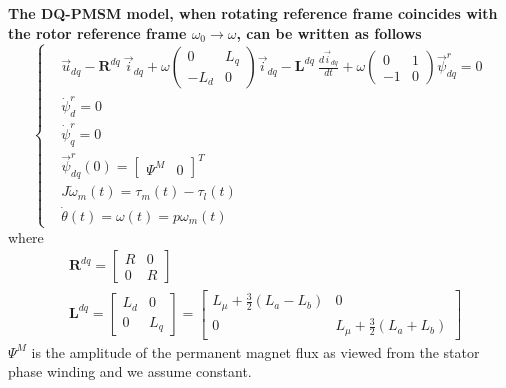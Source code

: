 \documentclass[11pt,a4paper,oneside]{book}
\numberwithin{equation}{section}
\theoremstyle{it}
\theoremstyle{definition}
\begin{document}
\begin{mybox}
	\textbf{The DQ-PMSM model, when rotating reference frame coincides with 
		the rotor reference frame $\omega_0 \rightarrow \omega$, can be written 
		as follows}
	\begin{equation}\label{twophase_eq2}
		\left\lbrace \begin{aligned}
			& \vec{u}_{dq}-\mathbf{R}^{dq}\ \vec{i}_{dq} + 
			\omega\begin{pmatrix} 0 & L_q\\ -L_d & 0 
			\end{pmatrix}\vec{i}_{dq} - \mathbf{L}^{dq}\ 
			\frac{d\vec{i}_{dq}}{dt} + \omega\begin{pmatrix} 0 & 1\\-1 & 0 
			\end{pmatrix}\vec{\psi}_{dq}^r = 0\\[6pt]
			&\dot{\psi}_d^r = 0 \\[6pt]
			&\dot{\psi}_q^r = 0 \\[6pt]
			& \vec{\psi}^r_{dq}(0) = \begin{bmatrix} \Psi^M &  0 
			\end{bmatrix}^T \\[6pt]
			& J\dot{\omega}_m(t) = \tau_m(t)-\tau_l(t) \\[6pt]
			& \dot{\theta}(t) = \omega(t) = p\omega_m(t) 
		\end{aligned} \right. 
	\end{equation}
	where
	\begin{equation*}
		\begin{aligned}
			& \mathbf{R}^{dq} = 
			\begin{bmatrix} R &  0 \\
				0 & R
			\end{bmatrix} \\[6pt]
			& \mathbf{L}^{dq} = 
			\begin{bmatrix} L_d &  0 \\
				0 & L_q
			\end{bmatrix} =
			\begin{bmatrix} L_\mu+\frac{3}{2}(L_a-L_b) &  0 \\
				0 & L_\mu+\frac{3}{2}(L_a+L_b)
			\end{bmatrix}
		\end{aligned} 
	\end{equation*}
	$\Psi^M$ is the amplitude of the permanent magnet flux as viewed from 
	the stator phase winding and we assume constant.
\end{mybox}
\end{document}
